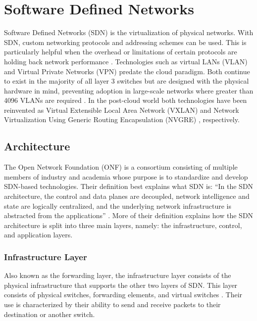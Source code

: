 \documentclass[12pt]{article}
\begin{document}
\section{Software Defined Networks} \label{sec:sdn}

Software Defined Networks (SDN) is the virtualization of physical networks. With SDN, custom networking protocols and addressing schemes can be used. This is particularly helpful when the overhead or limitations of certain protocols are holding back network performance \cite{Jennings2015}. Technologies such as virtual LANs (VLAN) \cite{vlan} and Virtual Private Networks (VPN) \cite{vlan} predate the cloud paradigm. Both continue to exist in the majority of all layer 3 switches but are designed with the physical hardware in mind, preventing adoption in large-scale networks where greater than 4096 VLANs are required \cite{wang2015survey}. In the post-cloud world both technologies have been reinvented as Virtual Extensible Local Area Network (VXLAN) \cite{vxlan} and Network Virtualization Using Generic Routing Encapsulation (NVGRE) \cite{nvgre}, respectively.



\subsection{Architecture}

The Open Network Foundation (ONF) is a consortium consisting of multiple members of industry and academia whose purpose is to standardize and develop SDN-based technologies. Their definition best explains what SDN is: ``In the SDN architecture, the control and data planes are decoupled, network intelligence and state are logically centralized, and the underlying network infrastructure is abstracted
from the applications'' \cite{onfSDNdef}. More of their definition explains how the SDN architecture is split into three main layers, namely: the infrastructure, control, and application layers.

\subsubsection{Infrastructure Layer}

Also known as the forwarding layer, the infrastructure layer consists of the physical infrastructure that supports the other two layers of SDN. This layer consists of physical switches, forwarding elements, and virtual switches \cite{yan2016software}. Their use is characterized by their ability to send and receive packets to their destination or another switch.
\end{document}
